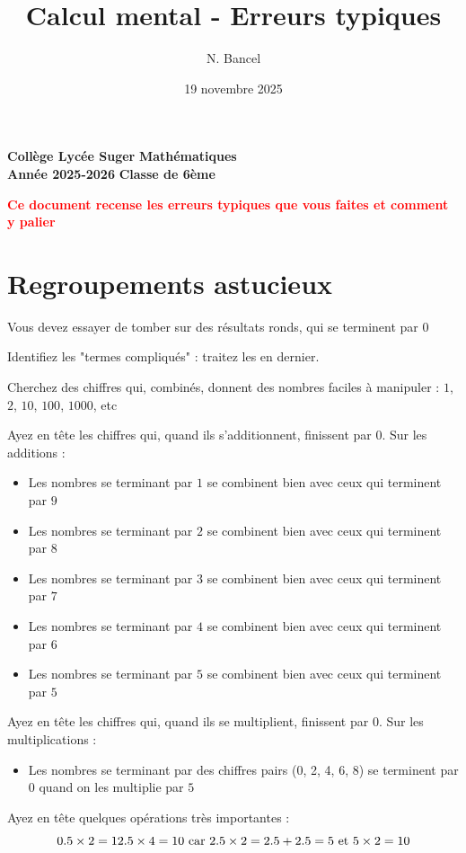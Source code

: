 \documentclass[answers]{exam}
\title{Calcul mental - Erreurs typiques}
\author{N. Bancel}
\date{19 novembre 2025}
\begin{document}
\textbf{Collège Lycée Suger}
\hfill
\textbf{Mathématiques} \\

\textbf{Année 2025-2026}
\hfill
\textbf{Classe de 6ème} \par

{\let\newpage\relax\maketitle}

\begin{center}
  \textbf{\textcolor{red}{Ce document recense les erreurs typiques que vous faites et comment y palier}} \\
  
\end{center}

\section{Regroupements astucieux}

\begin{compactitem}
\item Vous devez essayer de tomber sur des résultats ronds, qui se terminent par 0 
\item Identifiez les "termes compliqués" : traitez les en dernier.
\item Cherchez des chiffres qui, combinés, donnent des nombres faciles à manipuler : $1$, $2$, $10$, $100$, $1000$, etc
\item Ayez en tête les chiffres qui, quand ils s'additionnent, finissent par 0. Sur les additions : 
  \begin{itemize}
    \item Les nombres se terminant par $1$ se combinent bien avec ceux qui terminent par $9$
    \item Les nombres se terminant par $2$ se combinent bien avec ceux qui terminent par $8$
    \item Les nombres se terminant par $3$ se combinent bien avec ceux qui terminent par $7$
    \item Les nombres se terminant par $4$ se combinent bien avec ceux qui terminent par $6$
    \item Les nombres se terminant par $5$ se combinent bien avec ceux qui terminent par $5$
  \end{itemize}
  \item Ayez en tête les chiffres qui, quand ils se multiplient, finissent par 0. Sur les multiplications : 
    \begin{itemize}
    \item Les nombres se terminant par des chiffres pairs (0, 2, 4, 6, 8) se terminent par 0 quand on les multiplie par $5$
    \end{itemize}
  \item Ayez en tête quelques opérations très importantes : 
  \[
  0.5 \times 2 = 1 \\ \vspace{1em}
  2.5 \times 4 = 10 \text{ car } 2.5 \times 2 = 2.5 + 2.5 = 5 \text{ et } 5 \times 2 = 10
  \]
\end{compactitem}
\end{document}
